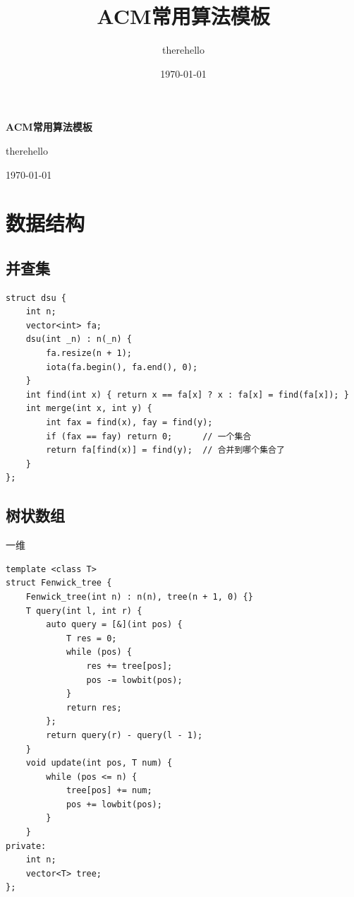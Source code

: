 \documentclass[UTF8]{ctexart}
\title{ACM常用算法模板}
\author{therehello}
\date{\today}
\begin{document}
\begin{sloppypar}

\begin{titlepage}
    \centering
    {\fontsize{40pt}{0pt}\selectfont \textbf{ACM常用算法模板}\par} %
    \vfill %
    {\fontsize{12pt}{0pt}\selectfont therehello\par} %
    \today %
\end{titlepage}

\tableofcontents

\clearpage

\section{数据结构}

\subsection{并查集}

\begin{lstlisting}[style=cpp]
struct dsu {
    int n;
    vector<int> fa;
    dsu(int _n) : n(_n) {
        fa.resize(n + 1);
        iota(fa.begin(), fa.end(), 0);
    }
    int find(int x) { return x == fa[x] ? x : fa[x] = find(fa[x]); }
    int merge(int x, int y) {
        int fax = find(x), fay = find(y);
        if (fax == fay) return 0;      // 一个集合
        return fa[find(x)] = find(y);  // 合并到哪个集合了
    }
};
\end{lstlisting}

\subsection{树状数组}

一维

\begin{lstlisting}[style=cpp]
template <class T>
struct Fenwick_tree {
    Fenwick_tree(int n) : n(n), tree(n + 1, 0) {}
    T query(int l, int r) {
        auto query = [&](int pos) {
            T res = 0;
            while (pos) {
                res += tree[pos];
                pos -= lowbit(pos);
            }
            return res;
        };
        return query(r) - query(l - 1);
    }
    void update(int pos, T num) {
        while (pos <= n) {
            tree[pos] += num;
            pos += lowbit(pos);
        }
    }
private:
    int n;
    vector<T> tree;
};
\end{lstlisting}


\end{sloppypar}
\end{document}

